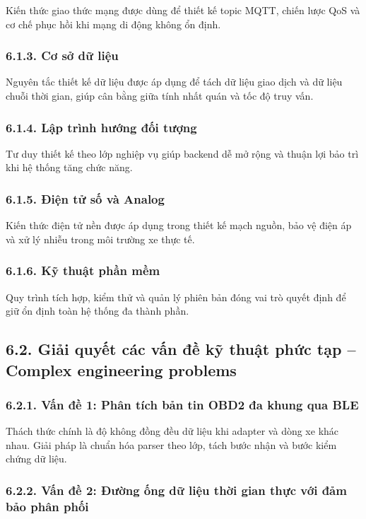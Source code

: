 \documentclass[a4paper]{extarticle}
\begin{document}
Kiến thức giao thức mạng được dùng để thiết kế topic MQTT, chiến lược QoS và cơ chế phục hồi khi mạng di động không ổn định.

\subsubsection{6.1.3. Cơ sở dữ liệu}

Nguyên tắc thiết kế dữ liệu được áp dụng để tách dữ liệu giao dịch và dữ liệu chuỗi thời gian, giúp cân bằng giữa tính nhất quán và tốc độ truy vấn.

\subsubsection{6.1.4. Lập trình hướng đối tượng}

Tư duy thiết kế theo lớp nghiệp vụ giúp backend dễ mở rộng và thuận lợi bảo trì khi hệ thống tăng chức năng.

\subsubsection{6.1.5. Điện tử số và Analog}

Kiến thức điện tử nền được áp dụng trong thiết kế mạch nguồn, bảo vệ điện áp và xử lý nhiễu trong môi trường xe thực tế.

\subsubsection{6.1.6. Kỹ thuật phần mềm}

Quy trình tích hợp, kiểm thử và quản lý phiên bản đóng vai trò quyết định để giữ ổn định toàn hệ thống đa thành phần.

\subsection{6.2. Giải quyết các vấn đề kỹ thuật phức tạp -- Complex engineering problems}

\subsubsection{6.2.1. Vấn đề 1: Phân tích bản tin OBD2 đa khung qua BLE}

Thách thức chính là độ không đồng đều dữ liệu khi adapter và dòng xe khác nhau. Giải pháp là chuẩn hóa parser theo lớp, tách bước nhận và bước kiểm chứng dữ liệu.

\subsubsection{6.2.2. Vấn đề 2: Đường ống dữ liệu thời gian thực với đảm bảo phân phối}
\end{document}
